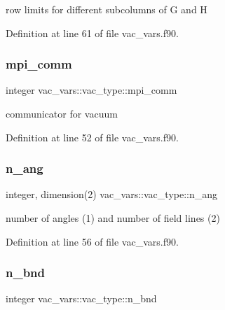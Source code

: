 row limits for different subcolumns of G and H 



Definition at line 61 of file vac\+\_\+vars.\+f90.

\mbox{\label{structvac__vars_1_1vac__type_af24c1254132acf04aef2f91952b73243}} 
\subsubsection{\texorpdfstring{mpi\+\_\+comm}{mpi\_comm}}
{\footnotesize\ttfamily integer vac\+\_\+vars\+::vac\+\_\+type\+::mpi\+\_\+comm}



communicator for vacuum 



Definition at line 52 of file vac\+\_\+vars.\+f90.

\mbox{\label{structvac__vars_1_1vac__type_ac337095579ae842776d35a4b975254e8}} 
\subsubsection{\texorpdfstring{n\+\_\+ang}{n\_ang}}
{\footnotesize\ttfamily integer, dimension(2) vac\+\_\+vars\+::vac\+\_\+type\+::n\+\_\+ang}



number of angles (1) and number of field lines (2) 



Definition at line 56 of file vac\+\_\+vars.\+f90.

\mbox{\label{structvac__vars_1_1vac__type_a099ac67e58545d9dd3863d0397f37b05}} 
\subsubsection{\texorpdfstring{n\+\_\+bnd}{n\_bnd}}
{\footnotesize\ttfamily integer vac\+\_\+vars\+::vac\+\_\+type\+::n\+\_\+bnd}



